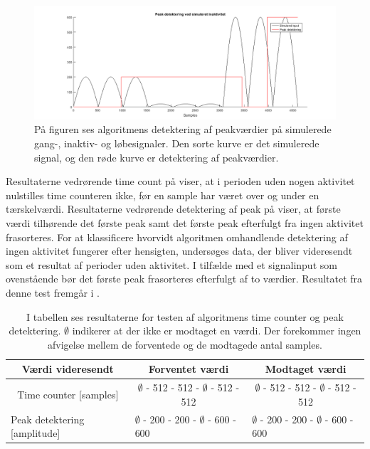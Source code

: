 \begin{figure}[H]
	\centering
	\includegraphics[width=.9\textwidth]{figures/cDesign/test_peak_inaktiv.png}
	\caption{På figuren ses algoritmens detektering af peakværdier på simulerede gang-, inaktiv- og løbesignaler. Den sorte kurve er det simulerede signal, og den røde kurve er detektering af peakværdier.}
	\label{fig:test_inaktiv_peak}
\end{figure}
Resultaterne vedrørende time count på  viser, at i perioden uden nogen aktivitet nulstilles time counteren ikke, før en sample har været over og under en tærskelværdi. Resultaterne vedrørende detektering af peak på  viser, at første værdi tilhørende det første peak samt det første peak efterfulgt fra ingen aktivitet frasorteres. For at klassificere hvorvidt algoritmen omhandlende detektering af ingen aktivitet fungerer efter hensigten, undersøges data, der bliver videresendt som et resultat af perioder uden aktivitet. I tilfælde med et signalinput som ovenstående bør det første peak frasorteres efterfulgt af to værdier. Resultatet fra denne test fremgår i . %
\begin{table}[H]
	\centering
	\begin{tabular}{ccc}
		\hline
		\rowcolor[HTML]{C0C0C0} 
		Værdi videresendt & Forventet værdi & Modtaget værdi \\ \hline
		Time counter [samples] & $\emptyset$ - 512 - 512 - $\emptyset$ - 512 - 512 & $\emptyset$ - 512 - 512 - $\emptyset$ - 512 - 512 \\ \hline
		\multicolumn{1}{l}{Peak detektering [amplitude]} &     \multicolumn{1}{l}{$\emptyset$ - 200 - 200 - $\emptyset$ - 600 - 600}     &     \multicolumn{1}{l}{$\emptyset$ - 200 - 200 - $\emptyset$ - 600 - 600} \\ \hline
	\end{tabular}
	\caption{I tabellen ses resultaterne for testen af algoritmens time counter og peak detektering. $\emptyset$ indikerer at der ikke er modtaget en værdi. Der forekommer ingen afvigelse mellem de forventede og de modtagede antal samples.}
	\label{tab:test_inaktiv}
\end{table}\vspace{-0.5cm}
